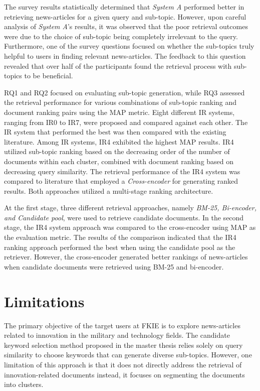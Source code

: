 The survey results statistically determined that \emph{System A} performed better in retrieving news-articles for a given query and sub-topic. However, upon careful analysis of \emph{System A}'s results, it was observed that the poor retrieval outcomes were due to the choice of sub-topic being completely irrelevant to the query. Furthermore, one of the survey questions focused on whether the sub-topics truly helpful to users in finding relevant news-articles. The feedback to this question revealed that over half of the participants found the retrieval process with sub-topics to be beneficial.

RQ1 and RQ2 focused on evaluating sub-topic generation, while RQ3 assessed the retrieval performance for various combinations of sub-topic ranking and document ranking pairs using the \ac{MAP} metric. Eight different \ac{IR} systems, ranging from IR0 to IR7, were proposed and compared against each other. The \ac{IR} system that performed the best was then compared with the existing literature. Among IR systems, IR4 exhibited the highest \ac{MAP} results. IR4 utilized sub-topic ranking based on the decreasing order of the number of documents within each cluster, combined with document ranking based on decreasing query similarity. The retrieval performance of the IR4 system was compared to literature that employed a \emph{Cross-encoder} for generating ranked results. Both approaches utilized a multi-stage ranking architecture.

At the first stage, three different retrieval approaches, namely \emph{BM-25, Bi-encoder, and Candidate pool}, were used to retrieve candidate documents. In the second stage, the IR4 system approach was compared to the cross-encoder using \ac{MAP} as the evaluation metric. The results of the comparison indicated that the IR4 ranking approach performed the best when using the candidate pool as the retriever. However, the cross-encoder generated better rankings of news-articles when candidate documents were retrieved using BM-25 and bi-encoder.

\section{Limitations}

The primary objective of the target users at \ac{FKIE} is to explore news-articles related to innovation in the military and technology fields. The candidate keyword selection method proposed in the master thesis relies solely on query similarity to choose keywords that can generate diverse sub-topics. However, one limitation of this approach is that it does not directly address the retrieval of innovation-related documents instead, it focuses on segmenting the documents into clusters.

